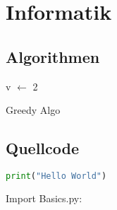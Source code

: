\documentclass{report}
\begin{document}
	\chapter{Informatik}
	\section{Algorithmen}
	\begin{algorithm}
		v $\gets$ 2 \\
	\caption{Greedy Algo}
	\end{algorithm}

	\section{Quellcode}
	\begin{lstlisting}[language=Python, frame=single]
		print("Hello World")
	\end{lstlisting}

	Import Basics.py:
	
	
\end{document}
